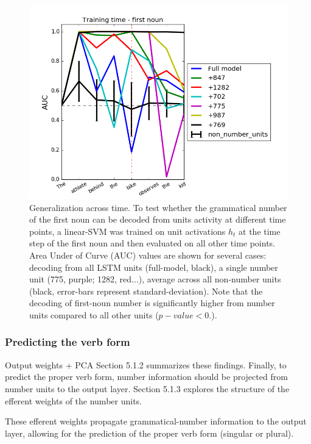 \begin{figure}
\centering
\includegraphics[width=\linewidth]{Figures/Figure3_number_units_GAT.png}
\caption{Generalization across time. To test whether the grammatical number of the first noun can be decoded from units activity at different time points, a linear-SVM was trained on unit activations $h_t$ at the time step of the first noun and then evaluated on all other time points. Area Under of Curve (AUC) values are shown for several cases: decoding from all LSTM units (full-model, black), a single number unit (775, purple; 1282, red...), average across all non-number units (black, error-bars represent standard-deviation). Note that the decoding of first-noun number is significantly higher from number units compared to all other units ($p-value<0.$).}
\end{figure}

\lipsum[1]

\subsubsection{Predicting the verb form}
Output weights + PCA
Section 5.1.2 summarizes these findings. Finally, to predict the proper verb form, number information should be projected from number units to the output layer. Section 5.1.3 explores the structure of the efferent weights of the number units. 

These efferent weights propagate grammatical-number information to the output layer, allowing for the prediction of the proper verb form (singular or plural). 


